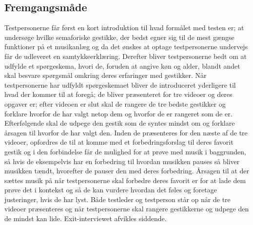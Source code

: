 \subsection{Fremgangsmåde}
\label{FremgangsmaadeValgAfGestikker}
%
Testpersonerne får først en kort introduktion til hvad formålet med testen er; at undersøge hvilke semaforiske gestikke, der bedst egner sig til de mest gængse funktioner på et musikanlæg og da det ønskes at optage testpersonerne undervejs får de udleveret en samtykkeerklæring. Derefter bliver testpersonerne bedt om at udfylde et spørgeskema, hvori de, foruden at angive køn og alder, blandt andet skal besvare spørgsmål omkring deres erfaringer med gestikker. Når testpersonerne har udfyldt spørgeskemaet bliver de introduceret yderligere til hvad der kommer til at foregå; de bliver præsenteret for tre videoer og deres opgaver er; efter videoen er slut skal de rangere de tre bedste gestikker og forklare hvorfor de har valgt netop dem og hvorfor de er rangeret som de er. Efterfølgende skal de udpege den gestik som de syntes mindst om og forklare årsagen til hvorfor de har valgt den. Inden de præsenteres for den næste af de tre videoer, opfordres de til at komme med et forbedringsforslag til deres favorit gestik og i den forbindelse får de mulighed for at prøve med musik i baggrunden, så hvis de eksempelvis har en forbedring til hvordan musikken pauses så bliver musikken tændt, hvorefter de pauser den med deres forbedring. Årsagen til at der sættes musik på når testpersonerne skal forbedre deres favorit er for at lade dem prøve det i kontekst og så de kan vurdere hvordan det føles og foretage justeringer, hvis de har lyst. Både testleder og testperson står op når de tre videoer præsenteres og når testpersonerne skal rangere gestikkerne og udpege den de mindst kan lide. Exit-interviewet afvikles siddende.  

